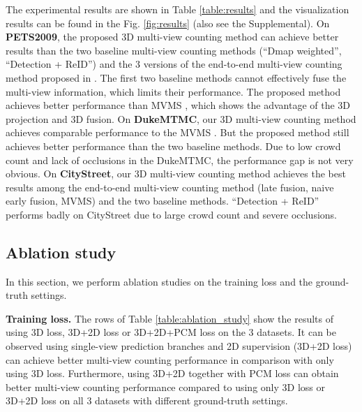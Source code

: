 \documentclass[letterpaper]{article} %
\newcommand{\citep}{\cite}
\newcommand{\citealp}[1]{\citeauthor{#1} \citeyear{#1}}
\begin{document}
The experimental results are shown in Table \ref{table:results} and the visualization results can be found in the Fig. \ref{fig:results} (also see the Supplemental). On \textbf{PETS2009}, the proposed 3D multi-view counting method can achieve better results than the two baseline multi-view counting methods (``Dmap weighted'', ``Detection + ReID'') and the 3 versions of the end-to-end multi-view counting method proposed in \citealp{zhang2019wide}. The first two baseline methods cannot effectively fuse the multi-view information, which limits their performance. The proposed method achieves better performance than MVMS \citep{zhang2019wide}, which shows the advantage of the 3D projection and 3D fusion.
On \textbf{DukeMTMC}, our 3D multi-view counting method achieves comparable performance to the MVMS \citep{zhang2019wide}. But the proposed method still achieves better performance than the two baseline methods. Due to low crowd count and lack of occlusions in the DukeMTMC, the performance gap is not very obvious. On \textbf{CityStreet}, our 3D multi-view counting method achieves the best results among the end-to-end multi-view counting method (late fusion, naive early fusion, MVMS) and the two baseline methods. ``Detection + ReID'' performs badly on CityStreet due to large crowd count and severe occlusions.



\subsection{Ablation study}

In this section, we perform ablation studies on the training loss and the ground-truth settings.

\textbf{Training loss.}
The rows of Table \ref{table:ablation_study} show the results of using 3D loss, 3D+2D loss or 3D+2D+PCM loss on the 3 datasets. It can be observed using single-view prediction branches and 2D supervision (3D+2D loss) can achieve better multi-view counting performance in comparison with only using 3D loss.
Furthermore, using 3D+2D together with PCM loss can obtain better multi-view counting performance compared to using only 3D loss or 3D+2D loss on all 3 datasets with different ground-truth settings.
\end{document}
